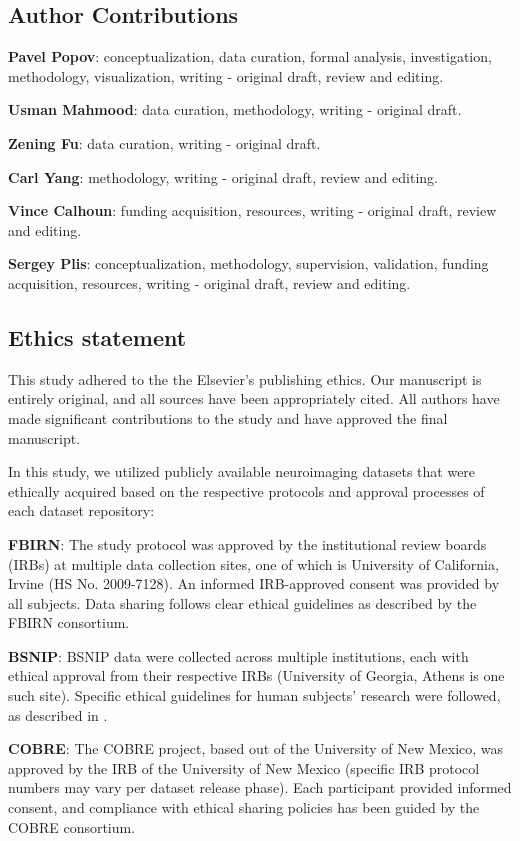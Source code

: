 \documentclass[final,5p,times,twocolumn,authoryear]{elsarticle}
\begin{document}
\subsection*{Author Contributions}
\noindent \textbf{Pavel Popov}: conceptualization, data curation, formal analysis, investigation, methodology, visualization, writing - original draft, review and editing.

\noindent \textbf{Usman Mahmood}: data curation, methodology, writing - original draft.
    
\noindent \textbf{Zening Fu}: data curation, writing - original draft.

\noindent \textbf{Carl Yang}: methodology, writing - original draft, review and editing.

\noindent \textbf{Vince Calhoun}: funding acquisition, resources, writing - original draft, review and editing.
    
\noindent \textbf{Sergey Plis}: conceptualization, methodology, supervision, validation, funding acquisition, resources, writing - original draft, review and editing.

\subsection*{Ethics statement}
This study adhered to the the Elsevier's publishing ethics. 
Our manuscript is entirely original, and all sources have been appropriately cited.
All authors have made significant contributions to the study and have approved the final manuscript.

In this study, we utilized publicly available neuroimaging datasets that were ethically acquired based on the respective protocols and approval processes of each dataset repository:

\noindent \textbf{FBIRN}: 
The study protocol was approved by the institutional review boards (IRBs) at multiple data collection sites, one of which is University of California, Irvine (HS No. 2009-7128). An informed IRB-approved consent was provided by all subjects. Data sharing follows clear ethical guidelines as described by the FBIRN consortium.

\noindent \textbf{BSNIP}: 
BSNIP data were collected across multiple institutions, each with ethical approval from their respective IRBs (University of Georgia, Athens is one such site). Specific ethical guidelines for human subjects' research were followed, as described in \citep{bsnip}.

\noindent \textbf{COBRE}: 
The COBRE project, based out of the University of New Mexico, was approved by the IRB of the University of New Mexico (specific IRB protocol numbers may vary per dataset release phase). Each participant provided informed consent, and compliance with ethical sharing policies has been guided by the COBRE consortium.
\end{document}

